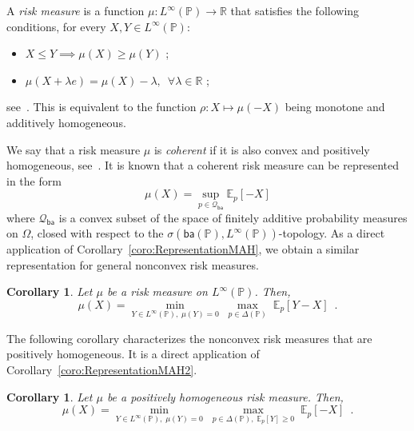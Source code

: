 \documentclass[a4paper,11pt]{amsart}
\newtheorem{corollary}[theorem]{Corollary}
\theoremstyle{definition}
\theoremstyle{remark}
\begin{document}
A {\em risk measure} is a function $\mu: L^\infty({\mathbb{P}}) \to {\mathbb{R}}$ that satisfies the following conditions, for every $X,Y \in L^\infty({\mathbb{P}})$:
\begin{itemize}
  \item $X {\leqslant} Y \implies \mu(X) {\geqslant} \mu(Y)$ ;
  \item $\mu(X+\lambda {e}) = \mu(X)-\lambda, \enspace \forall \lambda \in {\mathbb{R}}$ ;
\end{itemize}
see~\cite{FS11}.
This is equivalent to the function $\rho:X \mapsto \mu(-X)$ being monotone and additively homogeneous.

We say that a risk measure $\mu$ is {\em coherent} if it is also convex and positively homogeneous, see~\cite{ADEH99,Del02}.
It is known that a coherent risk measure can be represented in the form
\[ \mu(X) = \sup_{p \in \mathcal Q_{\mathsf{ba}}} {\mathbb{E}}_p[-X] \]
where $\mathcal Q_{\mathsf{ba}}$ is a convex subset of the space of finitely additive probability measures on $\Omega$, closed with respect to the $\sigma({\mathsf{ba}}({\mathbb{P}}),L^\infty({\mathbb{P}}))$-topology.
As a direct application of Corollary~\ref{coro:RepresentationMAH}, we obtain a similar representation for general nonconvex risk measures.
\begin{corollary}
  \label{coro:RepresentationRiskMeasure}
  Let $\mu$ be a risk measure on $L^\infty({\mathbb{P}})$.
  Then,
  \[
    \mu(X) = \min_{ Y \in L^\infty({\mathbb{P}}), \; \mu(Y)=0 } \; \max_{p \in \Delta({\mathbb{P}})} \; {\mathbb{E}}_p[Y-X] \enspace .
  \]
\end{corollary}

The following corollary characterizes the nonconvex risk measures that are positively homogeneous.
It is a direct application of Corollary~\ref{coro:RepresentationMAH2}.
\begin{corollary}
  Let $\mu$ be a positively homogeneous risk measure.
  Then,
  \[
    \mu(X) = \min_{ Y \in L^\infty({\mathbb{P}}), \; \mu(Y)=0 } \; \max_{ p \in \Delta({\mathbb{P}}), \; {\mathbb{E}}_p[Y] {\geqslant} 0 } \; {\mathbb{E}}_p[-X] \enspace.
  \]
\end{corollary}
\end{document}
